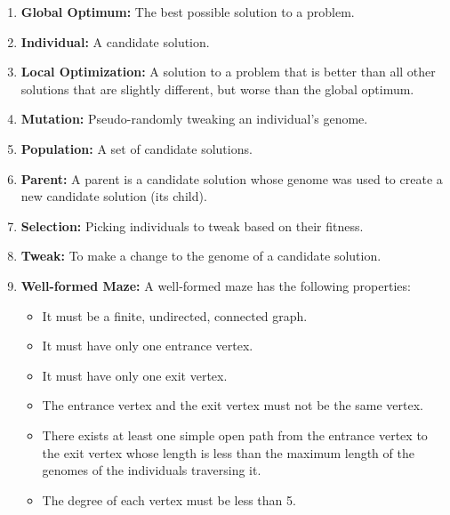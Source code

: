 \documentclass[letterpaper, 12pt]{article}
\begin{document}
\begin{enumerate}
	 \item\label{globalOptimimum}
		\textbf{Global Optimum:}
		The best possible solution to a problem.~\cite{blackGlobal}
	 
	 \item\label{individual}
		\textbf{Individual:} 
		A candidate solution.~\cite{Luke2013Metaheuristics}
	 
	 \item\label{localOptimum}
		\textbf{Local Optimization:} A solution to a problem that is better than all other solutions 
		that are slightly different, but worse than the global optimum.~\cite{blackLocal}
	 
	 \item\label{mutation}
		\textbf{Mutation:}
		Pseudo-randomly tweaking an individual's genome.~\cite{Luke2013Metaheuristics}
	 
	 \item\label{population}
		\textbf{Population:}
		A set of candidate solutions.~\cite{Luke2013Metaheuristics}
	 
	 \item\label{parent}
		\textbf{Parent:}
		A parent is a candidate solution whose genome was used to create a new
		candidate solution (its child).~\cite{Luke2013Metaheuristics} 
	 
	 \item\label{selection}
		\textbf{Selection:}
		Picking individuals to tweak based on their fitness.~\cite{Luke2013Metaheuristics}
	 
	 \item\label{tweak}
		\textbf{Tweak:}
		To make a change to the genome of a candidate solution.~\cite{Luke2013Metaheuristics}
	 
	 \item\label{wellFormedMaze}
		\textbf{Well-formed Maze:}
		A well-formed maze has the following properties:
		\begin{itemize}
		  \item It must be a finite, undirected, connected graph.
		  \item It must have only one entrance vertex.
		  \item It must have only one exit vertex.
  		  \item The entrance vertex and the exit vertex must not be the same vertex.
		  \item There exists at least one simple open path from the entrance vertex to the exit vertex whose length is less than the maximum length of the genomes of the individuals traversing it.
		  \item The degree of each vertex must be less than 5.
		\end{itemize}
  \end{enumerate}
\end{document}
